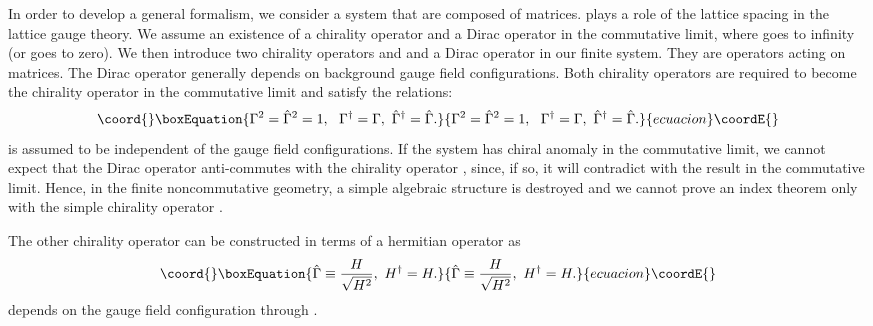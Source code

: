\documentclass[a4paper,prl,showpacs,twocolumn]{revtex4}
\begin{document}
In order to develop a general formalism, we 
consider a system that are composed
of \coordHE{} matrices. \coordHE{} plays a role of the lattice
spacing \coordHE{} in the lattice gauge theory.
We assume an existence of a chirality
operator  \myHighlight{$\gamma$}\coordHE{}  and a Dirac operator in the commutative limit,
where \coordHE{} goes to infinity (or \coordHE{} goes to zero). 
We then  introduce two chirality operators \myHighlight{$\Gamma$}\coordHE{}
and \myHighlight{$\hat{\Gamma}$}\coordHE{} and a Dirac operator \coordHE{} in our finite system.
They are operators acting on \coordHE{} matrices. 
The Dirac operator \coordHE{} generally depends on background gauge 
field configurations. Both chirality operators 
are required to become the chirality operator \myHighlight{$\gamma$}\coordHE{}
in the commutative limit and satisfy the relations:
\begin{equation}\coord{}\boxEquation{
\Gamma^2=\hat{\Gamma}^2=1, \ \ \Gamma^{\dagger}=\Gamma, \ 
\hat{\Gamma}^{\dagger} = \hat{\Gamma}.
\label{gamma}
}{
\Gamma^2=\hat{\Gamma}^2=1, \ \ \Gamma^{\dagger}=\Gamma, \ 
\hat{\Gamma}^{\dagger} = \hat{\Gamma}.
}{ecuacion}\coordE{}\end{equation}
\myHighlight{$\Gamma$}\coordHE{} is assumed to be 
independent of the gauge field configurations.
If the system has chiral anomaly in the commutative limit,
we cannot expect that the Dirac operator \coordHE{}
anti-commutes with the chirality operator \myHighlight{$\Gamma$}\coordHE{},
since, if so, it will contradict with the result in the commutative limit.
Hence, in the finite noncommutative geometry, a simple 
algebraic structure is destroyed and we cannot prove an index 
theorem only with the simple chirality operator \myHighlight{$\Gamma$}\coordHE{}.
\par
The other chirality operator \myHighlight{$\hat{\Gamma}$}\coordHE{} can be constructed in terms of
a hermitian operator \coordHE{} as 
\begin{equation}\coord{}\boxEquation{
\hat{\Gamma} \equiv \frac{H}{\sqrt{H^2}}, \ H^{\dagger}=H.
\label{hatgamma}
}{
\hat{\Gamma} \equiv \frac{H}{\sqrt{H^2}}, \ H^{\dagger}=H.
}{ecuacion}\coordE{}\end{equation}
\myHighlight{$\hat\Gamma$}\coordHE{} depends on the gauge field configuration 
through \myHighlight{$H$}\coordHE{}.
\par
\end{document}
